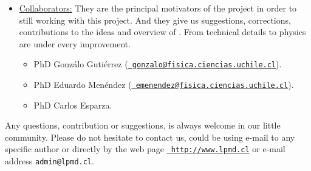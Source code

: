 \begin{itemize}
\item \underline{\sc Collaborators:} They are the principal motivators 
of the {\lpmd} project in order to still working with this project. And they
give us suggestions, corrections, contributions to the ideas and overview of
{\lpmd}. From technical details to physics are under every improvement.

\begin{itemize}
 \item PhD Gonz\'alo Guti\'errez
(\href{http://fisica.ciencias.uchile.cl/~gonzalo/}{\tt
gonzalo@fisica.ciencias.uchile.cl}).
 \item PhD Eduardo Men\'endez
(\href{http://fisica.ciencias.uchile.cl/~emenendez/}{\tt
emenendez@fisica.ciencias.uchile.cl}).
 \item PhD Carlos Esparza.
\end{itemize}
\end{itemize}

Any questions, contribution or suggestions, is always welcome in our little
community. Please do not hesitate to contact us, could be using e-mail to
any specific author or directly by the web page \href{http://www.lpmd.cl}{\tt
http://www.lpmd.cl} or e-mail address {\tt admin@lpmd.cl}.
